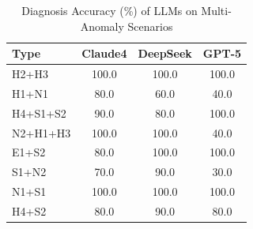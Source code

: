 \begin{table}[ht]
\centering
\footnotesize
\caption{Diagnosis Accuracy (\%) of LLMs on Multi-Anomaly Scenarios}
\label{tab:compound_failure_acc}
\setlength{\tabcolsep}{4pt}
\renewcommand{\arraystretch}{1.05}
\begin{tabular}{@{}p{1.2cm}ccc@{}}
\toprule
\textbf{Type} & \textbf{Claude4} & \textbf{DeepSeek} & \textbf{GPT-5} \\
\midrule
H2+H3      & 100.0 & 100.0 & 100.0 \\
H1+N1      & 80.0  & 60.0  & 40.0  \\
H4+S1+S2   & 90.0  & 80.0  & 100.0 \\
N2+H1+H3   & 100.0 & 100.0 & 40.0  \\
E1+S2      & 80.0  & 100.0 & 100.0 \\
S1+N2      & 70.0  & 90.0  & 30.0  \\
N1+S1      & 100.0 & 100.0 & 100.0 \\
H4+S2      & 80.0  & 90.0  & 80.0  \\
\bottomrule
\end{tabular}
\end{table}